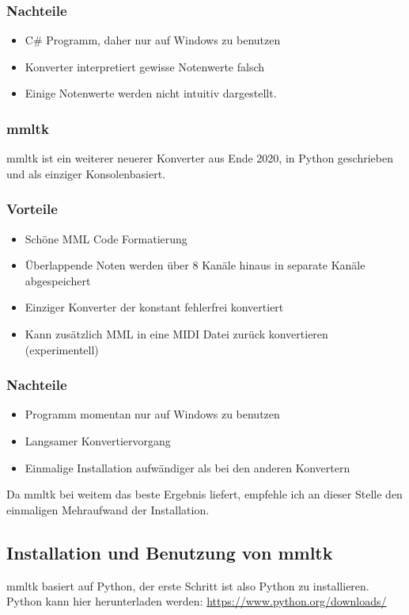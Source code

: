 \subsubsection*{Nachteile}
\begin{itemize}
	\item C\# Programm, daher nur auf Windows zu benutzen
	\item Konverter interpretiert gewisse Notenwerte falsch
	\item Einige Notenwerte werden nicht intuitiv dargestellt.
\end{itemize}

\subsubsection*{mmltk}
mmltk ist ein weiterer neuerer Konverter aus Ende 2020, in Python geschrieben und als einziger Konsolenbasiert.

\subsubsection*{Vorteile}
\begin{itemize}
	\item Schöne MML Code Formatierung
	\item Überlappende Noten werden über 8 Kanäle hinaus in separate Kanäle abgespeichert
	\item Einziger Konverter der konstant fehlerfrei konvertiert
	\item Kann zusätzlich MML in eine MIDI Datei zurück konvertieren (experimentell)
\end{itemize}

\subsubsection*{Nachteile}
\begin{itemize}
	\item Programm momentan nur auf Windows zu benutzen
	\item Langsamer Konvertiervorgang
	\item Einmalige Installation aufwändiger als bei den anderen Konvertern
\end{itemize}

Da mmltk bei weitem das beste Ergebnis liefert, empfehle ich an dieser Stelle den einmaligen Mehraufwand der Installation.

\subsection{Installation und Benutzung von mmltk}
mmltk basiert auf Python, der erste Schritt ist also Python zu installieren.
Python kann hier herunterladen werden: \href{https://www.python.org/downloads/}{https://www.python.org/downloads/}

